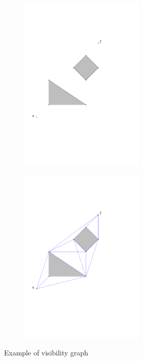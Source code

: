 \begin{figure}[H]
	\begin{subfigure}{.5\textwidth}
		\includegraphics[width=6cm]{figures/visibilitygraph1.pdf}
		\caption{}
	\label{fig:visibilitygraph1}
	\end{subfigure}
	\begin{subfigure}{.5\textwidth}
		\includegraphics[width=6cm]{figures/visibilitygraph.pdf}
		\caption{}
		\label{fig:visibilitygraph2}
	\end{subfigure}
	\caption{Example of visibility graph}
	\label{visibilitygraph}
\end{figure}

